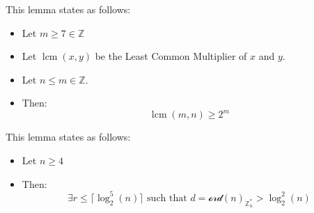 \begin{lemma}\label{nair_lemma}
    This lemma states as follows:
    \begin{itemize}
        \item Let $m \geq 7 \in \mathbb{Z}$
        \item Let $\operatorname{lcm}(x,y)$ be the Least Common Multiplier of $x$ and $y$.
        \item Let $n \leq m \in \mathbb{Z}$.
        \item Then: \[\operatorname{lcm}(m,n) \geq 2^{m}\]
    \end{itemize}
\end{lemma}

\begin{lemma}\label{aks_lemma}
    This lemma states as follows:
    \begin{itemize}
        \item Let $n \geq 4$
        \item Then: \[\exists r \leq \lceil \operatorname{log}_{2}^{5}(n) \rceil \text{ such that } d = \mathcal{ord}(n)_{\mathbb{Z}_n^*} > \operatorname{log}_2^2(n)\]
    \end{itemize}
\end{lemma}
